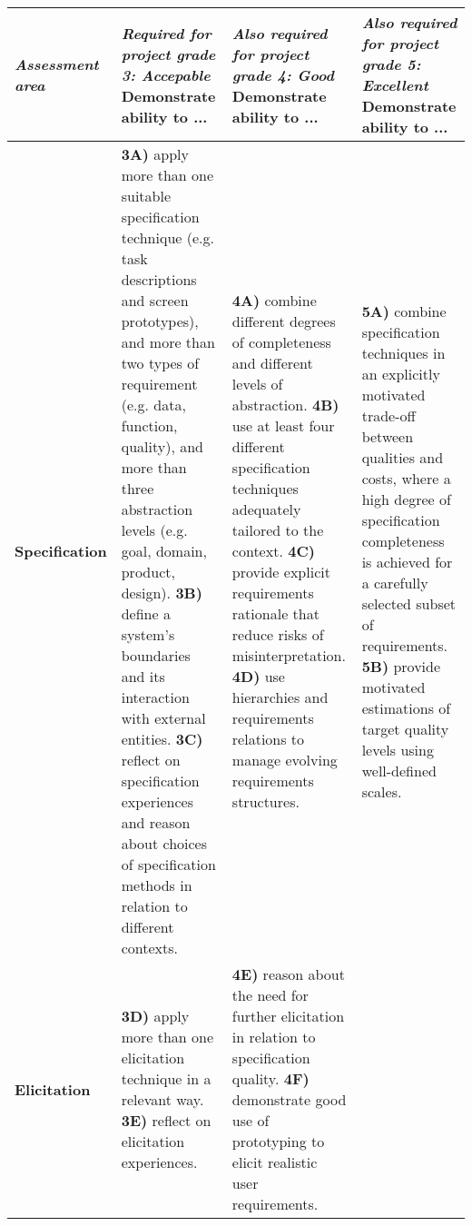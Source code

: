 \documentclass{project}
\begin{document}
\begin{adjustbox}{width=1.0\textwidth}


\begin{tabular}{| p{2.3cm} |p{6.2cm} | p{6.2cm} | p{6.2cm} |}
\hline
{\it Assessment area} & {\it Required for project grade {\bf 3: Accepable}} \newline Demonstrate ability to ... & {\it Also required for project grade {\bf 4: Good}} \newline Demonstrate ability to ...& {\it Also required for project grade {\bf 5: Excellent}} \newline Demonstrate ability to ... \\
\hline
\hline
{\bf Specification} &
    {\bf 3A)} apply more than one suitable specification technique (e.g. task descriptions and screen prototypes), and more than two types of requirement (e.g. data, function, quality), and more than three abstraction levels (e.g. goal, domain, product, design). \newline
    {\bf 3B)} define a system's boundaries and its interaction with external entities. \newline
    {\bf 3C)} reflect on specification experiences and reason about choices of specification methods in relation to different contexts. &
    {\bf 4A)} combine different degrees of completeness and different levels of abstraction. \newline
    {\bf 4B)} use at least four different specification techniques adequately tailored to the context. \newline
    {\bf 4C)} provide explicit requirements rationale that reduce risks of misinterpretation. \newline
    {\bf 4D)} use hierarchies and requirements relations to manage evolving requirements structures. &
    {\bf 5A)} combine specification techniques in an explicitly motivated trade-off between qualities and costs, where a high degree of specification completeness is achieved for a carefully selected subset of requirements.     \newline
    {\bf 5B)} provide motivated estimations of target quality levels using well-defined scales.
\\ \hline

{\bf Elicitation}  &
    {\bf 3D)} apply more than one elicitation technique in a relevant way. \newline
    {\bf 3E)} reflect on elicitation experiences. &

    {\bf 4E)} reason about the need for further elicitation in relation to specification quality. \newline
      {\bf 4F)} demonstrate good use of prototyping to elicit realistic user requirements.&
    


\end{tabular}
\end{adjustbox}
\end{document}
